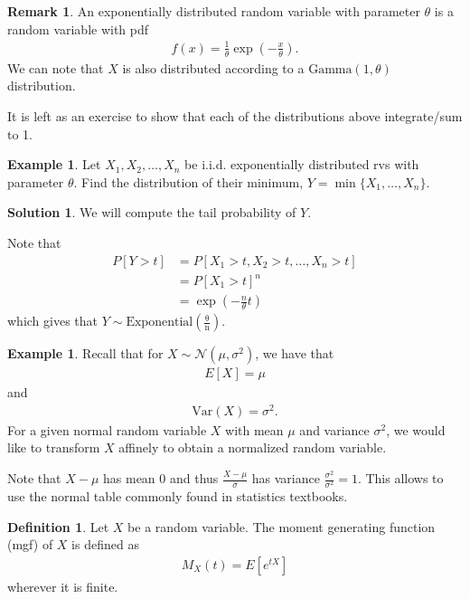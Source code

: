 \documentclass[11pt]{amsart}
\theoremstyle{definition}
\newtheorem{definition}[theorem]{Definition}
\newtheorem{remark}[theorem]{Remark}
\newtheorem{example}[theorem]{Example}
\newtheorem{solution}[theorem]{Solution}
\numberwithin{equation}{section}
\begin{document}
\begin{remark}
    An exponentially distributed random variable with parameter $\theta$ is a random variable with pdf
    \begin{align*}
        f(x)=\frac{1}{\theta}\exp\left(-\frac{x}{\theta}\right).
    \end{align*}
    We can note that $X$ is also distributed according to a $\mathrm{Gamma}(1,\theta)$ distribution.
\end{remark}
It is left as an exercise to show that each of the distributions above integrate/sum to 1.
\begin{example}
    Let $X_1,X_2,\ldots, X_n$ be i.i.d. exponentially distributed rvs with parameter $\theta$. Find the distribution of their minimum, $Y=\min\{X_1,\ldots,X_n\}$.
\end{example}
\addtocounter{theorem}{-1}
\begin{solution}
    We will compute the tail probability of $Y$.

    Note that
    \begin{align*}
        P[Y> t]&=P[X_1> t,X_2> t,\ldots,X_n> t]\\
        &=P[X_1> t]^n\\
        &=\exp\left(-\frac{n}{\theta} t\right)
    \end{align*}
    which gives that $Y\sim\mathrm{Exponential(\frac{\theta}{n})}$.
\end{solution}
\begin{example}
    Recall that for $X\sim\mathcal N(\mu,\sigma^2)$, we have that
    \begin{align*}
        E[X]=\mu
    \end{align*}
    and
    \begin{align*}
        \mathrm{Var}(X)=\sigma^2.
    \end{align*}
    For a given normal random variable $X$ with mean $\mu$ and variance $\sigma^2$, we would like to transform $X$ affinely to obtain a normalized random variable.

    Note that $X-\mu$ has mean 0 and thus $\frac{X-\mu}{\sigma}$ has variance $\frac{\sigma^2}{\sigma^2}=1$. This allows to use the normal table commonly found in statistics textbooks.
\end{example}
\begin{definition}
    Let $X$ be a random variable. The moment generating function (mgf) of $X$ is defined as
    \begin{align*}
        M_X(t)=E[e^{tX}]
    \end{align*}
    wherever it is finite.
\end{definition}
\end{document}
